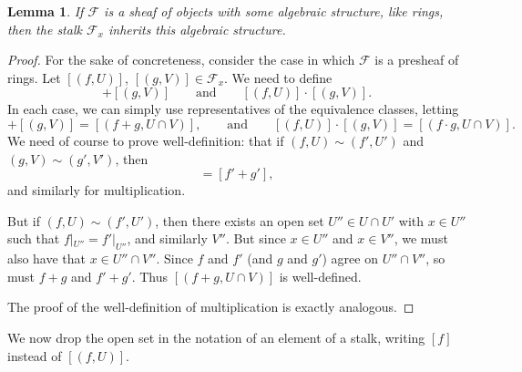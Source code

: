\documentclass[a4paper]{report}
\theoremstyle{definition}
\theoremstyle{plain}
\newtheorem{lemma}{Lemma}[section]
\theoremstyle{remark}
\begin{document}
\begin{lemma}
  If $\mathcal{F}$ is a sheaf of objects with some algebraic structure, like rings, then the stalk $\mathcal{F}_{x}$ inherits this algebraic structure. 
\end{lemma}
\begin{proof}
  For the sake of concreteness, consider the case in which $\mathcal{F}$ is a presheaf of rings. Let $[(f, U)]$, $[(g, V)] \in \mathcal{F}_{x}$. We need to define 
  \begin{equation*}
    [(f, U)] + [(g, V)]\qquad\text{and}\qquad [(f, U)] \cdot [(g, V)].
  \end{equation*}
  In each case, we can simply use representatives of the equivalence classes, letting
  \begin{equation*}
    [(f, U)] + [(g, V)] = [(f+g, U \cap V)],\qquad\text{and}\qquad[(f, U)]\cdot [(g, V)] = [(f\cdot g, U \cap V)].
  \end{equation*}
  We need of course to prove well-definition: that if $(f, U) \sim (f', U')$ and $(g, V) \sim (g', V')$, then
  \begin{equation*}
    [f+g] = [f'+g'],
  \end{equation*}
  and similarly for multiplication.

  But if $(f, U) \sim (f', U')$, then there exists an open set $U'' \in U \cap U'$ with $x \in U''$ such that $f|_{U''} = f'|_{U''}$, and similarly $V''$. But since $x \in U''$ and $x \in V''$, we must also have that $x \in U'' \cap V''$. Since $f$ and $f'$ (and $g$ and $g'$) agree on $U'' \cap V''$, so must $f+g$ and $f' + g'$. Thus $[(f + g, U \cap V)]$ is well-defined.

  The proof of the well-definition of multiplication is exactly analogous.
\end{proof}

We now drop the open set in the notation of an element of a stalk, writing $[f]$ instead of $[(f, U)]$.
\end{document}
